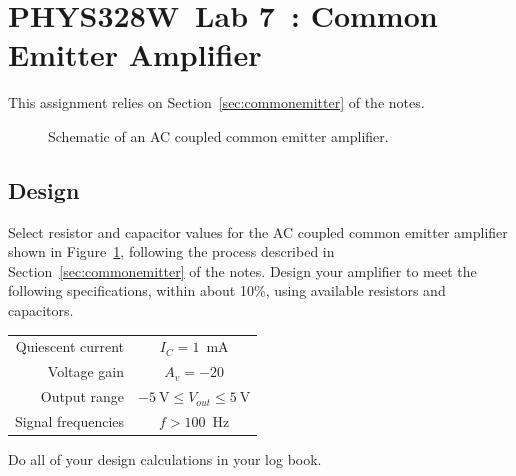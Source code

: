 \documentclass[11pt]{article}
\newcommand{\COURSE}{PHYS328W}
\newcommand{\LABNUM}{7}
\newcommand{\TITLE}{Common Emitter Amplifier}
\begin{document}
\thispagestyle{empty}

\section*{\COURSE\ Lab \LABNUM\ : \TITLE}

This assignment relies on Section~\ref{sec:commonemitter} of the notes.

\begin{figure}[ht]
  \begin{center}
    \caption{Schematic of an AC coupled common emitter amplifier.}
    \label{fig:commonemittercircuit}
  \end{center}
\end{figure}

\subsection*{Design}

Select resistor and capacitor values for the AC coupled common emitter
amplifier shown in Figure~\ref{fig:commonemittercircuit}, following the
process described in Section~\ref{sec:commonemitter} of the notes.
Design your amplifier to meet the following specifications, within
about 10\%, using available resistors and capacitors.
\begin{center}
\begin{tabular}{rc}
 Quiescent current & $I_C = 1$~mA \\
      Voltage gain & $A_v = -20$ \\
      Output range & $-5~\mathrm{V} \leq V_{out} \leq 5~\mathrm{V}$ \\
Signal frequencies & $f > 100$~Hz \\
\end{tabular}
\end{center}
Do all of your design calculations in your log book.
\end{document}

